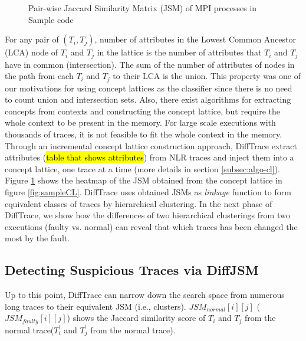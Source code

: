 \begin{figure}[]
\centering
{}
\caption{Pair-wise Jaccard Similarity Matrix (JSM) of MPI processes in Sample code}
\label{fig:jsm2}
\end{figure}

For any pair of $(T_i,T_j)$, number of attributes in the Lowest Common Ancestor (LCA) node of $T_i$ and $T_j$ in the lattice is the number of attributes that $T_i$ and $T_j$ have in common (intersection). The sum of the number of attributes of nodes in the path from each $T_i$ and $T_j$ to their LCA is the union. This property was one of our motivations for using concept lattices as the classifier since there is no need to count union and intersection sets. 
%
Also, there exist algorithms for extracting concepts from contexts and constructing the concept lattice, but require the whole context to be present in the memory. 
%
For large scale executions with thousands of traces, it is not feasible to fit the whole context in the memory.
%
Through an incremental concept lattice construction approach, DiffTrace extract attributes (\hl{table that shows attributes}) from NLR traces and inject them into a concept lattice, one trace at a time (more details in section \ref{subsec:algo-cl}).
%
Figure \ref{fig:jsm2} shows the heatmap of the JSM obtained from the concept lattice in figure \ref{fig:sampleCL}.
%
DiffTrace uses obtained JSMs as \textit{linkage} function to form equivalent classes of traces by hierarchical clustering.
%
In the next phase of DiffTrace, we show how the differences of two hierarchical clusterings from two executions (faulty vs. normal) can reveal that which traces has been changed the most by the fault.



\subsection{Detecting Suspicious Traces via DiffJSM}
Up to this point, DiffTrace can narrow down the search space from numerous long traces to their equivalent JSM (i.e., clusters).
%
$JSM_{normal}[i][j]$ ($JSM_{faulty}[i][j]$) shows the Jaccard similarity score of $T_i$ and $T_j$ from the normal trace($T_i^\prime$ and $T_j^\prime$ from the normal trace).

